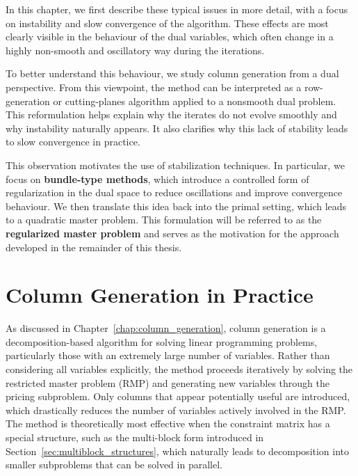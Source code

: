 \documentclass{book}
\theoremstyle{definition}
\newcounter{algorithm_}
\numberwithin{algorithm_}{chapter}
\begin{document}
\medskip

In this chapter, we first describe these typical issues in more detail, with a focus on instability and slow convergence of the algorithm. These effects are most clearly visible in the behaviour of the dual variables, which often change in a highly non-smooth and oscillatory way during the iterations.

\medskip

To better understand this behaviour, we study column generation from a dual perspective. From this viewpoint, the method can be interpreted as a row-generation or cutting-planes algorithm applied to a nonsmooth dual problem. This reformulation helps explain why the iterates do not evolve smoothly and why instability naturally appears. It also clarifies why this lack of stability leads to slow convergence in practice.

\medskip

This observation motivates the use of stabilization techniques. In particular, we focus on \textbf{bundle-type methods}, which introduce a controlled form of regularization in the dual space to reduce oscillations and improve convergence behaviour. We then translate this idea back into the primal setting, which leads to a quadratic master problem. This formulation will be referred to as the \textbf{regularized master problem} and serves as the motivation for the approach developed in the remainder of this thesis.

\vspace*{\fill}


\newpage

\section{Column Generation in Practice}

As discussed in Chapter~\ref{chap:column_generation}, column generation is a decomposition-based algorithm for solving linear programming problems, particularly those with an extremely large number of variables. Rather than considering all variables explicitly, the method proceeds iteratively by solving the restricted master problem (RMP) and generating new variables through the pricing subproblem. Only columns that appear potentially useful are introduced, which drastically reduces the number of variables actively involved in the RMP. The method is theoretically most effective when the constraint matrix has a special structure, such as the multi-block form introduced in Section~\ref{sec:multiblock_structures}, which naturally leads to decomposition into smaller subproblems that can be solved in parallel.
\end{document}
